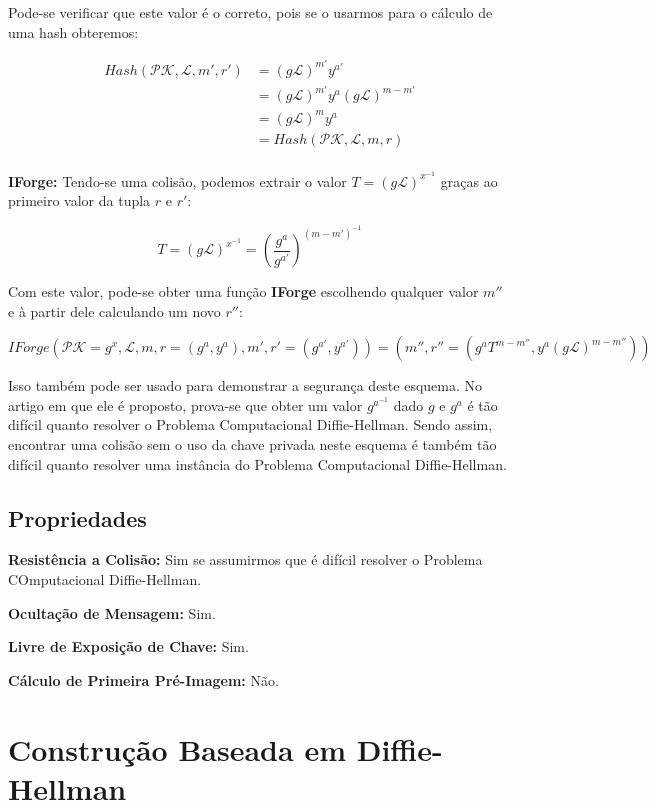 \documentclass[a4paper]{article}
\begin{document}
Pode-se verificar que este valor é o correto, pois se o usarmos para o
cálculo de uma hash obteremos:

\begin{equation}
\begin{split}
  Hash(\mathcal{PK},\mathcal{L}, m', r') &= (g\mathcal{L})^{m'}y^{a'}\\
  &= (g\mathcal{L})^{m'}y^{a}(g\mathcal{L})^{m-m'}\\
  &= (g\mathcal{L})^{m}y^{a}\\
  &= Hash(\mathcal{PK},\mathcal{L}, m, r)\\
\end{split}
\end{equation}

\textbf{IForge:} Tendo-se uma colisão, podemos extrair o valor $T =
(g\mathcal{L})^{x^{-1}}$ graças ao primeiro valor da tupla $r$ e $r'$:

$$
T = (g\mathcal{L})^{x^{-1}} = \left(\frac{g^a}{g^{a'}}\right)^{(m-m')^{-1}}
$$

Com este valor, pode-se obter uma função \textbf{IForge} escolhendo
qualquer valor $m''$ e à partir dele calculando um novo $r''$:

$$ IForge(\mathcal{PK}=g^x, \mathcal{L}, m, r=(g^a, y^a), m',
r'=(g^{a'}, y^{a'})) = (m'', r''=(g^aT^{m-m''},
y^{a}(g\mathcal{L})^{m-m''}))
$$

Isso também pode ser usado para demonstrar a segurança deste
esquema. No artigo em que ele é proposto, prova-se que obter um valor
$g^{a^{-1}}$ dado $g$ e $g^a$ é tão difícil quanto resolver o Problema
Computacional Diffie-Hellman. Sendo assim, encontrar uma colisão sem o
uso da chave privada neste esquema é também tão difícil quanto
resolver uma instância do Problema Computacional Diffie-Hellman.

\subsection{Propriedades}

\textbf{Resistência a Colisão: }Sim se assumirmos que é difícil resolver o Problema COmputacional Diffie-Hellman.

\textbf{Ocultação de Mensagem: }Sim.

\textbf{Livre de Exposição de Chave: } Sim.

\textbf{Cálculo de Primeira Pré-Imagem: }Não.

\section{Construção Baseada em Diffie-Hellman \cite{ateniese}}
\end{document}
